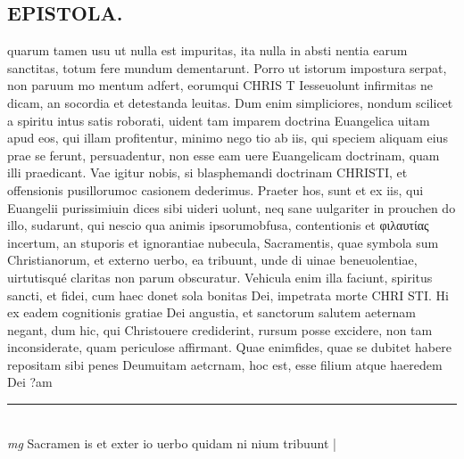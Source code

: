 \documentclass{article}
\begin{document}
\begin{pages}
\section*{EPISTOLA. }\pstart quarum tamen usu ut nulla est impuritas, ita nulla in absti nentia earum sanctitas, totum fere mundum dementarunt. Porro ut istorum impostura serpat, non paruum mo mentum adfert, eorumqui CHRIS T Iesseuolunt infirmitas ne dicam, an socordia et detestanda leuitas. Dum enim simpliciores, nondum scilicet a spiritu intus satis roborati, uident tam imparem doctrina Euangelica uitam apud eos, qui illam profitentur, minimo nego tio ab iis, qui speciem aliquam eius prae se ferunt, persuadentur, non esse eam uere Euangelicam doctrinam, quam illi praedicant.  Vae igitur nobis, si blasphemandi doctrinam CHRISTI, et offensionis pusillorumoc casionem dederimus.  \pend\pstart Praeter hos, sunt et ex iis, qui Euangelii purissimiuin dices sibi uideri uolunt, neq sane uulgariter in prouchen do illo, sudarunt, qui nescio qua animis ipsorumobfusa, contentionis et φιλαυτίας incertum, an stuporis et ignorantiae nubecula, Sacramentis, quae symbola sum Christianorum, et externo uerbo, ea tribuunt, unde di uinae beneuolentiae, uirtutisqué claritas non parum obscuratur. Vehicula enim illa faciunt, spiritus sancti, et fidei, cum haec donet sola bonitas Dei, impetrata morte CHRI STI. Hi ex eadem cognitionis gratiae Dei angustia, et sanctorum salutem aeternam negant, dum hic, qui Christouere crediderint, rursum posse excidere, non tam inconsiderate, quam periculose affirmant. Quae enimfides, quae se dubitet habere repositam sibi penes Deumuitam aetcrnam, hoc est, esse filium atque haeredem Dei ?am  \pend
\vspace{0.5cm}\noindent
\vspace{0.2cm}\rule{1cm}{0.2pt}\\ 
\hspace{0.2cm}\textit{mg}
\footnotesize Sacramen is et exter io uerbo quidam ni nium tribuunt
\normalsize| 

\end{pages}
\end{document}
